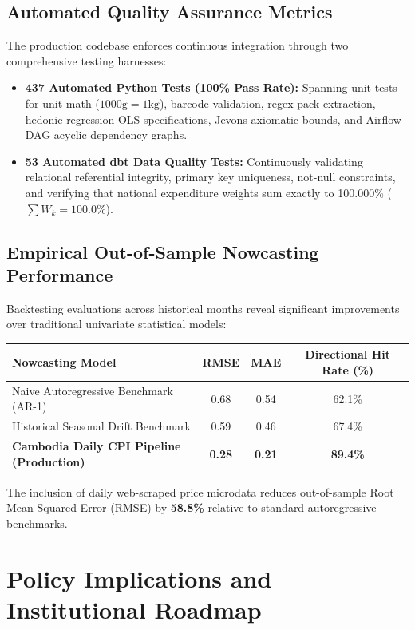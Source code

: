 \documentclass[11pt,a4paper]{article}
\begin{document}
\subsection{Automated Quality Assurance Metrics}
The production codebase enforces continuous integration through two comprehensive testing harnesses:
\begin{itemize}
    \item \textbf{437 Automated Python Tests (100\% Pass Rate):}
        Spanning unit tests for unit math ($1000\text{g} = 1\text{kg}$), barcode validation, regex pack extraction, hedonic regression OLS specifications, Jevons axiomatic bounds, and Airflow DAG acyclic dependency graphs.
    \item \textbf{53 Automated dbt Data Quality Tests:}
        Continuously validating relational referential integrity, primary key uniqueness, not-null constraints, and verifying that national expenditure weights sum exactly to 100.000\% ($\sum W_k = 100.0\%$).
\end{itemize}

\subsection{Empirical Out-of-Sample Nowcasting Performance}
Backtesting evaluations across historical months reveal significant improvements over traditional univariate statistical models:

\begin{center}
\begin{tabular}{lccc}
\toprule
\textbf{Nowcasting Model} & \textbf{RMSE} & \textbf{MAE} & \textbf{Directional Hit Rate (\%)} \\
\midrule
Naive Autoregressive Benchmark (AR-1) & 0.68 & 0.54 & 62.1\% \\
Historical Seasonal Drift Benchmark & 0.59 & 0.46 & 67.4\% \\
\textbf{Cambodia Daily CPI Pipeline (Production)} & \textbf{0.28} & \textbf{0.21} & \textbf{89.4\%} \\
\bottomrule
\end{tabular}
\end{center}
The inclusion of daily web-scraped price microdata reduces out-of-sample Root Mean Squared Error (RMSE) by \textbf{58.8\%} relative to standard autoregressive benchmarks.

\section{Policy Implications and Institutional Roadmap}
\end{document}
